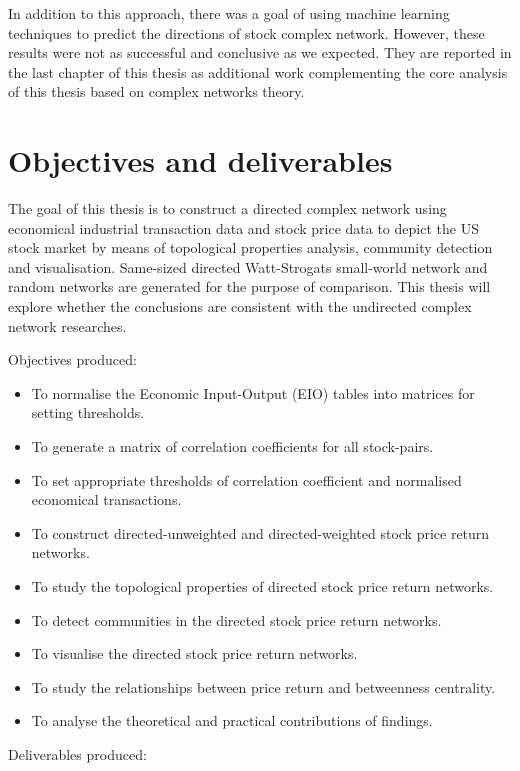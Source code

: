 In addition to this approach, there was a goal of using machine learning techniques to predict the directions of stock complex network. However, these results were not as successful and conclusive as we expected. They are reported in the last chapter of this thesis as additional work complementing the core analysis of this thesis based on complex networks theory.

\section{Objectives and deliverables}
The goal of this thesis is to construct a directed complex network using economical industrial transaction data and stock price data to depict the US stock market by means of topological properties analysis, community detection and visualisation. Same-sized directed Watt-Strogats small-world network and random networks are generated for the purpose of comparison. This thesis will explore whether the conclusions are consistent with the undirected complex network researches.

\vline

Objectives produced:

\begin{itemize}
	\item To normalise the Economic Input-Output (EIO) tables into matrices for setting thresholds.
	\item To generate a matrix of correlation coefficients for all stock-pairs.
	\item To set appropriate thresholds of correlation coefficient and normalised economical transactions.
	\item To construct directed-unweighted and directed-weighted stock price return networks.
	\item To study the topological properties of directed stock price return networks.
	\item To detect communities in the directed stock price return networks.
	\item To visualise the directed stock price return networks.
	\item To study the relationships between price return and betweenness centrality.
	\item To analyse the theoretical and practical contributions of findings.
\end{itemize}

\vline

Deliverables produced:

